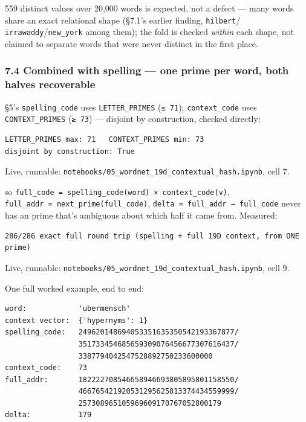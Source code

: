 \documentclass[
  10pt,
]{article}
\begin{document}
559 distinct values over 20,000 words is expected, not a defect --- many
words share an exact relational shape (§7.1's earlier finding,
\texttt{hilbert}/ \texttt{irrawaddy}/\texttt{new\_york} among them); the
fold is checked \emph{within} each shape, not claimed to separate words
that were never distinct in the first place.

\hypertarget{combined-with-spelling-one-prime-per-word-both-halves-recoverable}{%
\subsubsection{7.4 Combined with spelling --- one prime per word, both
halves
recoverable}\label{combined-with-spelling-one-prime-per-word-both-halves-recoverable}}

§5's \texttt{spelling\_code} uses \texttt{LETTER\_PRIMES}
(\texttt{≤\ 71}); \texttt{context\_code} uses \texttt{CONTEXT\_PRIMES}
(\texttt{≥\ 73}) --- disjoint by construction, checked directly:

\begin{verbatim}
LETTER_PRIMES max: 71   CONTEXT_PRIMES min: 73
disjoint by construction: True
\end{verbatim}

Live, runnable:
\texttt{notebooks/05\_wordnet\_19d\_contextual\_hash.ipynb}, cell 7.

so \texttt{full\_code\ =\ spelling\_code(word)\ ×\ context\_code(v)},
\texttt{full\_addr\ =\ next\_prime(full\_code)},
\texttt{delta\ =\ full\_addr\ −\ full\_code} never has an prime that's
ambiguous about which half it came from. Measured:

\begin{verbatim}
286/286 exact full round trip (spelling + full 19D context, from ONE prime)
\end{verbatim}

Live, runnable:
\texttt{notebooks/05\_wordnet\_19d\_contextual\_hash.ipynb}, cell 9.

One full worked example, end to end:

\begin{verbatim}
word:            'ubermensch'
context vector:  {'hypernyms': 1}
spelling_code:   249620148694053351635350542193367877/
                 351733454685659309076456677307616437/
                 3387794042547528892750233600000
context_code:    73
full_addr:       182222708546658946693805895801158550/
                 466765421920531295625813374434559999/
                 257308965105969609170767052800179
delta:           179
\end{verbatim}
\end{document}

